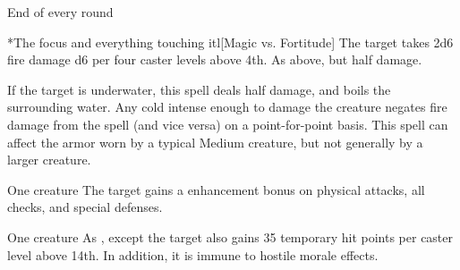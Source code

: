 \begin{spellheader}
    \spellrng{\rngmed}
    \spelldur{\durshort \dismissable}
\end{spellheader}
\begin{spelleffects}
    \begin{spelltrigger}{End of every round}
        \begin{spelltargets}*{The focus and everything touching it}l[Magic vs. Fortitude]
            \spellsuccess The target takes 2d6 fire damage \add d6 per four caster levels above 4th.
            \spellfailure As above, but half damage.
        \end{spelltargets}
    \end{spelltrigger}
\end{spelleffects}
\begin{spellfooter}
    \spellnotes If the target is underwater, this spell deals half damage, and boils the surrounding water. Any cold intense enough to damage the creature negates fire damage from the spell (and vice versa) on a point-for-point basis. This spell can affect the armor worn by a typical Medium creature, but not generally by a larger creature.
\end{spellfooter}

\begin{spellheader}
    \spellrng{\rngclose}
    \spelldur{\durshort \dismissable}
\end{spellheader}
\begin{spelleffects}
    \begin{spelltarget}{One creature}
        \spelleffect The target gains a  enhancement bonus on physical attacks, all checks, and special defenses. \spellbonusscalingdescription
    \end{spelltarget}
\end{spelleffects}
\begin{spellfooter}
    
\end{spellfooter}

\begin{spellheader}
    \spellrng{\rngclose}
    \spelldur{\durshort \dismissable}
\end{spellheader}
\begin{spelleffects}
    \begin{spelltarget}{One creature}
        \spelleffect As , except the target also gains 35 temporary hit points  per caster level above 14th. In addition, it is immune to hostile morale effects.
    \end{spelltarget}
\end{spelleffects}
\begin{spellfooter}
    
\end{spellfooter}

